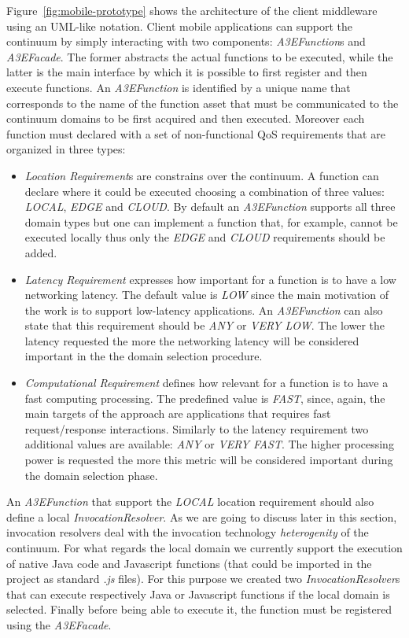 Figure~\ref{fig:mobile-prototype} shows the architecture of the client middleware using an UML-like notation. Client mobile applications can support the continuum by simply interacting with two components:  \textit{A3EFunction}s and \textit{A3EFacade}. The former abstracts the actual functions to be executed, while the latter is the main interface by which it is possible to first register and then execute functions. An \textit{A3EFunction} is identified by a unique name that corresponds to the name of the function asset that must be communicated to the continuum domains to be first acquired and then executed. Moreover each function must declared with a set of non-functional QoS requirements that are organized in three types: 

\begin{itemize}
	\item \textit{Location Requirement}s are constrains over the continuum. A function can declare where it could be executed choosing a combination of three values: \textit{LOCAL}, \textit{EDGE} and \textit{CLOUD}. By default an \textit{A3EFunction} supports all three domain types but one can implement a function that, for example, cannot be executed locally thus only the \textit{EDGE} and \textit{CLOUD} requirements should be added.    
	\item \textit{Latency Requirement} expresses how important for a function is to have a low networking latency. The default value is \textit{LOW} since the main motivation of the work is to support low-latency applications. An \textit{A3EFunction}  can  also state that this requirement should be \textit{ANY} or \textit{VERY LOW}. The lower the latency requested the more the networking latency will be considered important in the the domain selection procedure.
	\item \textit{Computational Requirement} defines how relevant for a function is to have a fast computing processing. The predefined value is \textit{FAST}, since, again, the main targets of the approach are applications that requires fast request/response interactions. Similarly to the latency requirement two additional values are available:  \textit{ANY} or \textit{VERY FAST}. The higher  processing power is requested the more this metric will be considered important during the domain selection phase.
\end{itemize}

An \textit{A3EFunction} that support the \textit{LOCAL} location requirement should also define a local \textit{InvocationResolver}. As we are going to discuss later in this section, invocation resolvers deal with the invocation technology \textit{heterogenity}  of the continuum. For what regards the local domain we currently support the execution of native Java code and Javascript functions (that could be imported in the project as standard \textit{.js} files). For this purpose we created two \textit{InvocationResolver}s that can execute respectively Java or Javascript functions if the local domain is selected.  Finally before being able to execute it, the function must be registered using the \textit{A3EFacade}.

